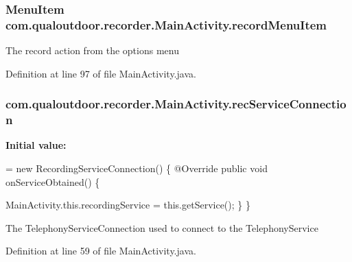 \hypertarget{classcom_1_1qualoutdoor_1_1recorder_1_1MainActivity_a76c5025a8bcde6c93e3bb320333f5d4a}{
\subsubsection[{record\-Menu\-Item}]{\setlength{\rightskip}{0pt plus 5cm}Menu\-Item com.\-qualoutdoor.\-recorder.\-Main\-Activity.\-record\-Menu\-Item\hspace{0.3cm}{\ttfamily [private]}}}\label{classcom_1_1qualoutdoor_1_1recorder_1_1MainActivity_a76c5025a8bcde6c93e3bb320333f5d4a}
The record action from the options menu 

Definition at line 97 of file Main\-Activity.\-java.

\hypertarget{classcom_1_1qualoutdoor_1_1recorder_1_1MainActivity_a672740db9e6801d1f94786f3cac1ae7a}{
\subsubsection[{rec\-Service\-Connection}]{ com.\-qualoutdoor.\-recorder.\-Main\-Activity.\-rec\-Service\-Connection\hspace{0.3cm}{\ttfamily [private]}}}\label{classcom_1_1qualoutdoor_1_1recorder_1_1MainActivity_a672740db9e6801d1f94786f3cac1ae7a}
{\bfseries Initial value\-:}
\begin{DoxyCode}
= \textcolor{keyword}{new} RecordingServiceConnection() \{
        @Override
        \textcolor{keyword}{public} \textcolor{keywordtype}{void} onServiceObtained() \{
            
            MainActivity.this.recordingService = this.getService();
        \}
    \}
\end{DoxyCode}
The Telephony\-Service\-Connection used to connect to the Telephony\-Service 

Definition at line 59 of file Main\-Activity.\-java.

